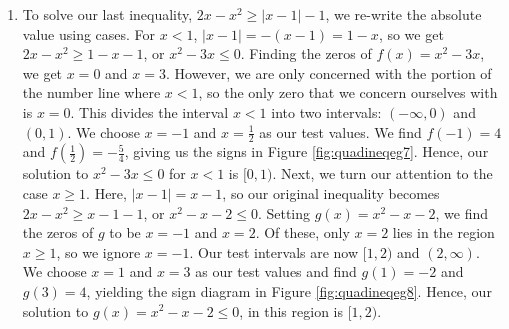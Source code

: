 {\begin{enumerate}
In this case, we say the line $y=2x$ is \textbf{tangent} to $y=x^2+1$ at $\left(1, 2\right)$.  Finding tangent lines to arbitrary functions is a fundamental problem solved, in general, with Calculus.



\drawexampleline



\item  To solve our last inequality,  $2x-x^2 \geq |x-1|-1$, we re-write the absolute value using cases.  For $x < 1$, $|x-1| = -(x-1) = 1-x$, so we get $2x-x^2 \geq 1-x-1$, or $x^2-3x \leq 0$.  Finding the zeros of $f(x) = x^2-3x$, we get $x=0$ and $x=3$.  However, we are only concerned with the portion of the number line where $x < 1$, so the only zero that we concern ourselves with is $x=0$.  This divides the interval $x<1$ into two intervals:  $(-\infty, 0)$ and $(0,1)$.  We choose $x=-1$ and $x=\frac{1}{2}$ as our test values.  We find $f(-1) = 4$ and $f\left(\frac{1}{2}\right) = -\frac{5}{4}$, giving us the signs in Figure \ref{fig:quadineqeg7}. Hence, our solution to $x^2-3x \leq 0$ for $x < 1$ is $[0,1)$.  Next, we turn our attention to the case $x \geq 1$.  Here, $|x-1| = x-1$, so our original inequality becomes $2x-x^2 \geq x-1-1$, or $x^2-x-2 \leq 0$.  Setting $g(x) = x^2-x-2$, we find the zeros of $g$ to be $x=-1$ and $x=2$.  Of these, only $x=2$ lies in the region $x \geq 1$, so we ignore $x=-1$.  Our test intervals are now $[1,2)$ and $(2,\infty)$.  We choose $x=1$ and $x=3$ as our test values and find $g(1) = -2$ and $g(3) = 4$, yielding the sign diagram in Figure \ref{fig:quadineqeg8}.  Hence, our solution to $g(x) = x^2-x-2 \leq 0$, in this region is $[1,2)$.





\end{enumerate}}

